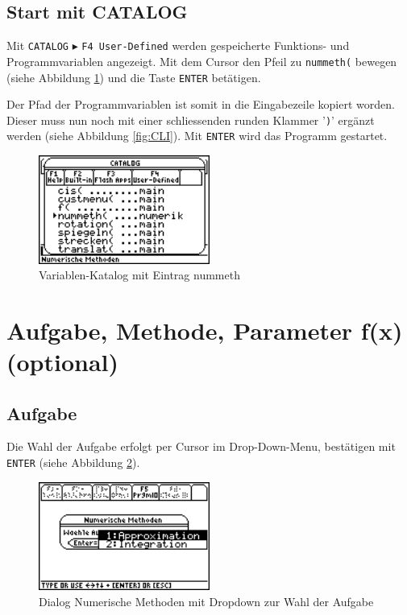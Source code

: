 \documentclass[a4paper,10pt]{scrreprt}
\begin{document}
\subsection*{Start mit CATALOG}
Mit \verb|CATALOG| $\blacktriangleright$ \verb|F4 User-Defined| werden gespeicherte Funk­tions- und Programmvariablen an­ge­zeigt. Mit dem Cursor den Pfeil zu \verb|nummeth(| bewegen (siehe Abbildung \ref{fig:CATALOG}) und die Taste \verb|ENTER| bet\"atigen.

Der Pfad der Programmvariablen ist somit in die Eingabezeile kopiert worden. Dieser muss nun noch mit einer schliessenden runden Klammer '\verb|)|' erg\"anzt werden (siehe Abbildung \ref{fig:CLI}). Mit \verb|ENTER| wird das Programm gestartet.
\begin{figure}[h]
  \centering
  \includegraphics[width=0.5\textwidth]{img/nummeth_image005.png}
  \caption{Variablen-Katalog mit Eintrag nummeth}
  \label{fig:CATALOG}
\end{figure}

\newpage
\section{Aufgabe, Methode, Parameter f(x) (optional)}
\subsection*{Aufgabe}
Die Wahl der Aufgabe erfolgt per Cursor im Drop-Down-Menu, best\"atigen mit \verb|ENTER| (siehe Abbildung \ref{fig:Aufgabe}).
\begin{figure}[h]
  \centering
  \includegraphics[width=0.5\textwidth]{img/nummeth_image008.png}
  \caption{Dialog Numerische Methoden mit Dropdown zur Wahl der Aufgabe}
  \label{fig:Aufgabe}
\end{figure}
\end{document}
